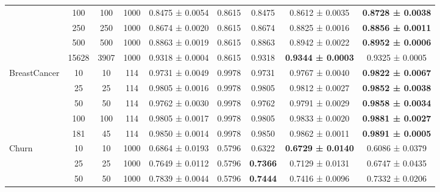 \begin{table}
{\begin{tabular}[H]{@{}lcccccccc@{}}
                              & 100   & 100  & 1000 & 0.8475 ± 0.0054      & 0.8615                & 0.8475          & 0.8612 ± 0.0035          & \textbf{0.8728 ± 0.0038} \\
                              & 250   & 250  & 1000 & 0.8674 ± 0.0020      & 0.8615                & 0.8674          & 0.8825 ± 0.0016          & \textbf{0.8856 ± 0.0011} \\
                              & 500   & 500  & 1000 & 0.8863 ± 0.0019      & 0.8615                & 0.8863          & 0.8942 ± 0.0022          & \textbf{0.8952 ± 0.0006} \\
                              & 15628 & 3907 & 1000 & 0.9318 ± 0.0004      & 0.8615                & 0.9318          & \textbf{0.9344 ± 0.0003} & 0.9325 ± 0.0005          \\
                              \midrule
\multirow{5}{*}{BreastCancer} & 10    & 10   & 114  & 0.9731 ± 0.0049      & 0.9978                & 0.9731          & 0.9767 ± 0.0040          & \textbf{0.9822 ± 0.0067} \\
                              & 25    & 25   & 114  & 0.9805 ± 0.0016      & 0.9978                & 0.9805          & 0.9812 ± 0.0027          & \textbf{0.9852 ± 0.0038} \\
                              & 50    & 50   & 114  & 0.9762 ± 0.0030      & 0.9978                & 0.9762          & 0.9791 ± 0.0029          & \textbf{0.9858 ± 0.0034} \\
                              & 100   & 100  & 114  & 0.9805 ± 0.0017      & 0.9978                & 0.9805          & 0.9833 ± 0.0020          & \textbf{0.9881 ± 0.0027} \\
                              & 181   & 45   & 114  & 0.9850 ± 0.0014      & 0.9978                & 0.9850          & 0.9862 ± 0.0011          & \textbf{0.9891 ± 0.0005} \\
                              \midrule
\multirow{7}{*}{Churn}        & 10    & 10   & 1000 & 0.6864 ± 0.0193      & 0.5796                & 0.6322          & \textbf{0.6729 ± 0.0140} & 0.6086 ± 0.0379          \\
                              & 25    & 25   & 1000 & 0.7649 ± 0.0112      & 0.5796                & \textbf{0.7366} & 0.7129 ± 0.0131          & 0.6747 ± 0.0435          \\
                              & 50    & 50   & 1000 & 0.7839 ± 0.0044      & 0.5796                & \textbf{0.7444} & 0.7416 ± 0.0096          & 0.7332 ± 0.0206          \\

\end{tabular}}
\end{table}
